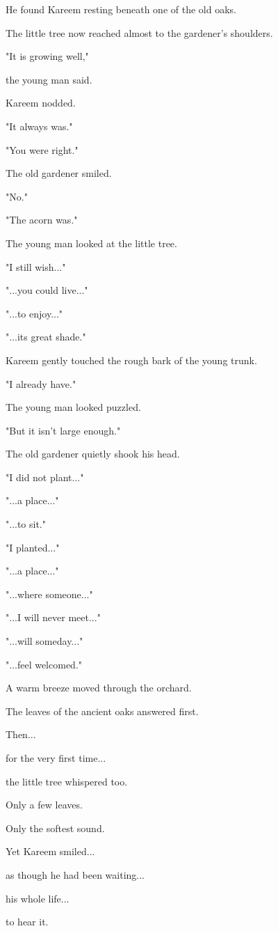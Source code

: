 \documentclass[12pt,openany]{book}
\begin{document}
He found Kareem resting beneath one of the old oaks.

The little tree now reached almost to the gardener's shoulders.

"It is growing well,"

the young man said.

Kareem nodded.

"It always was."

"You were right."

The old gardener smiled.

"No."

"The acorn was."

The young man looked at the little tree.

"I still wish..."

"...you could live..."

"...to enjoy..."

"...its great shade."

Kareem gently touched the rough bark of the young trunk.

"I already have."

The young man looked puzzled.

"But it isn't large enough."

The old gardener quietly shook his head.

"I did not plant..."

"...a place..."

"...to sit."

"I planted..."

"...a place..."

"...where someone..."

"...I will never meet..."

"...will someday..."

"...feel welcomed."

A warm breeze moved through the orchard.

The leaves of the ancient oaks answered first.

Then...

for the very first time...

the little tree whispered too.

Only a few leaves.

Only the softest sound.

Yet Kareem smiled...

as though he had been waiting...

his whole life...

to hear it.
\end{document}
